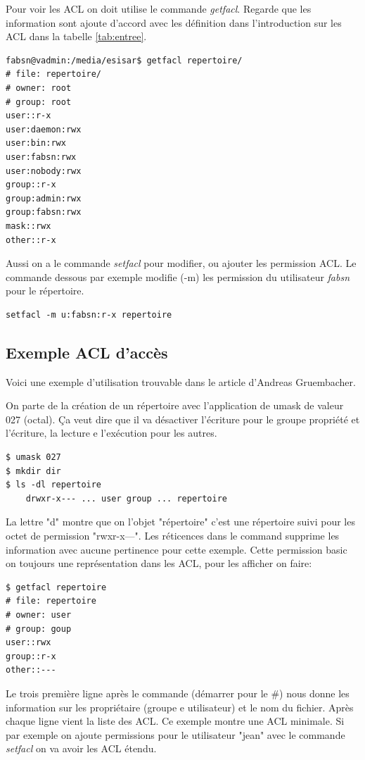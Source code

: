 Pour voir les ACL on doit utilise le commande \emph{getfacl}. Regarde que les information sont ajoute d'accord avec les définition dans l'introduction sur les ACL dans la tabelle \ref{tab:entree}. 

\begin{verbatim}
fabsn@vadmin:/media/esisar$ getfacl repertoire/
# file: repertoire/
# owner: root
# group: root
user::r-x
user:daemon:rwx
user:bin:rwx
user:fabsn:rwx
user:nobody:rwx
group::r-x
group:admin:rwx
group:fabsn:rwx
mask::rwx
other::r-x	
\end{verbatim}

Aussi on a le commande \emph{setfacl} pour modifier, ou ajouter les permission ACL. Le commande dessous par exemple modifie (-m) les permission du utilisateur \emph{fabsn} pour le répertoire. 

\begin{verbatim}
setfacl -m u:fabsn:r-x repertoire
\end{verbatim}

\subsection*{Exemple ACL d'accès}

Voici une exemple d'utilisation trouvable dans le article d'Andreas Gruembacher\cite{aclsuse}.

On parte de la création de un répertoire avec l'application de umask de valeur 027 (octal). Ça veut dire que il va   désactiver l'écriture pour le groupe propriété et l'écriture, la lecture e l'exécution pour les autres.

\begin{verbatim}
$ umask 027 
$ mkdir dir 
$ ls -dl repertoire
	drwxr-x--- ... user group ... repertoire
\end{verbatim}

La lettre "d" montre que on l'objet "répertoire" c'est une répertoire suivi pour les octet de permission "rwxr-x---". Les réticences dans le command supprime les information avec aucune pertinence pour cette exemple. Cette permission basic on toujours une représentation dans les ACL, pour les afficher on faire:

\begin{verbatim}
$ getfacl repertoire
# file: repertoire 
# owner: user 
# group: goup
user::rwx
group::r-x
other::---
\end{verbatim}

Le trois première ligne après le commande (démarrer pour le \#) nous donne les information sur les propriétaire (groupe e utilisateur) et le nom du fichier. Après chaque ligne vient la liste des ACL. Ce exemple montre une ACL minimale. Si par exemple on ajoute permissions pour le utilisateur "jean" avec le commande \emph{setfacl} on va avoir les ACL étendu.

